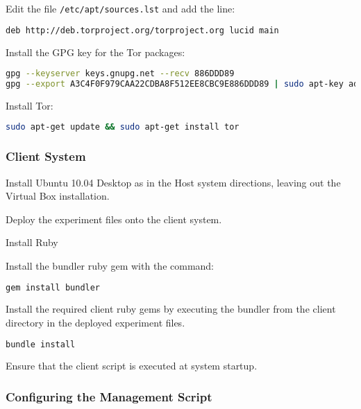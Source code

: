 \begin{enumerate*}
  \item Edit the file \verb+/etc/apt/sources.lst+ and add the line:
    \begin{lstlisting}[language=sh]
deb http://deb.torproject.org/torproject.org lucid main
    \end{lstlisting}
  \item Install the GPG key for the Tor packages:
    \begin{lstlisting}[language=sh]
gpg --keyserver keys.gnupg.net --recv 886DDD89
gpg --export A3C4F0F979CAA22CDBA8F512EE8CBC9E886DDD89 | sudo apt-key add -
    \end{lstlisting}
  \item Install Tor:
    \begin{lstlisting}[language=sh]
sudo apt-get update && sudo apt-get install tor
    \end{lstlisting}
\end{enumerate*}

\subsubsection{Client System}

Install Ubuntu 10.04 Desktop as in the Host system directions, leaving out the
Virtual Box installation.

\begin{enumerate*}
  \item Deploy the experiment files onto the client system.
  \item Install Ruby
  \item Install the bundler ruby gem with the command:
    \begin{lstlisting}[language=sh]
gem install bundler
    \end{lstlisting}
  \item Install the required client ruby gems by executing the bundler from the client directory in the deployed experiment files.
    \begin{lstlisting}[language=sh]
bundle install
    \end{lstlisting}
  \item Ensure that the client script is executed at system startup.
\end{enumerate*}

\subsubsection{Configuring the Management Script}


